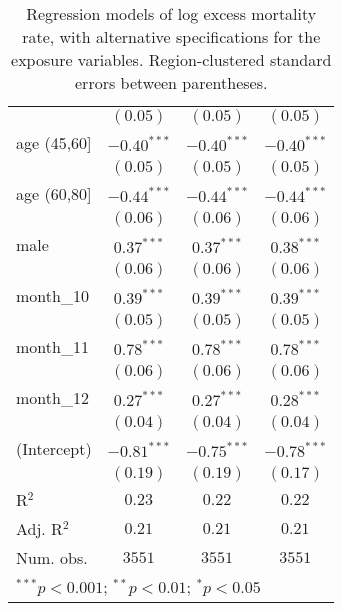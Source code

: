 \begin{table}
\begin{center}
\begin{tabular}{l c c c}
                    & $(0.05)$      & $(0.05)$      & $(0.05)$      \\
age (45,60]         & $-0.40^{***}$ & $-0.40^{***}$ & $-0.40^{***}$ \\
                    & $(0.05)$      & $(0.05)$      & $(0.05)$      \\
age (60,80]         & $-0.44^{***}$ & $-0.44^{***}$ & $-0.44^{***}$ \\
                    & $(0.06)$      & $(0.06)$      & $(0.06)$      \\
male                & $0.37^{***}$  & $0.37^{***}$  & $0.38^{***}$  \\
                    & $(0.06)$      & $(0.06)$      & $(0.06)$      \\
month\_10           & $0.39^{***}$  & $0.39^{***}$  & $0.39^{***}$  \\
                    & $(0.05)$      & $(0.05)$      & $(0.05)$      \\
month\_11           & $0.78^{***}$  & $0.78^{***}$  & $0.78^{***}$  \\
                    & $(0.06)$      & $(0.06)$      & $(0.06)$      \\
month\_12           & $0.27^{***}$  & $0.27^{***}$  & $0.28^{***}$  \\
                    & $(0.04)$      & $(0.04)$      & $(0.04)$      \\
(Intercept)         & $-0.81^{***}$ & $-0.75^{***}$ & $-0.78^{***}$ \\
                    & $(0.19)$      & $(0.19)$      & $(0.17)$      \\
\hline
R$^2$               & $0.23$        & $0.22$        & $0.22$        \\
Adj. R$^2$          & $0.21$        & $0.21$        & $0.21$        \\
Num. obs.           & $3551$        & $3551$        & $3551$        \\
\hline
\multicolumn{4}{l}{\scriptsize{$^{***}p<0.001$; $^{**}p<0.01$; $^{*}p<0.05$}}
\end{tabular}
\caption{Regression models of log excess mortality rate, with alternative specifications for the exposure variables. Region-clustered standard errors between parentheses.}
\label{tab:altspecmodels}
\end{center}
\end{table}
